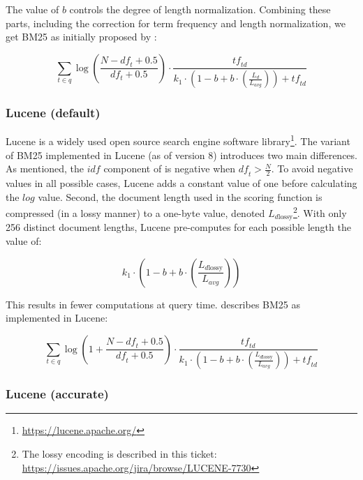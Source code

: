 The value of $b$ controls the degree of length normalization. Combining these parts, including the correction for term frequency and length normalization, we get BM25 as initially proposed by \citet{bm25-robertson}:

\begin{equation}
	\label{bm25-robertson}
	\sum_{t\in q} \log\left(\frac{N-\mathit{df}_t+0.5}{df_t+0.5}\right)\cdot\frac{\mathit{tf}_{\mathit{td}}}{k_1\cdot\left(1-b+b\cdot\left(\frac{L_d}{L_{\mathit{avg}}}\right)\right) + \mathit{tf}_{\mathit{td}}}
\end{equation}

\subsubsection{Lucene (default)}
Lucene is a widely used open source search engine software library\footnote{\url{https://lucene.apache.org/}}. 
The variant of BM25 implemented in Lucene (as of version 8) introduces two main differences. As mentioned, the $\mathit{idf}$ component of \citet{bm25-robertson} is negative when $\mathit{df}_t > \frac{N}{2}$.
To avoid negative values in all possible cases, Lucene adds a constant value of one before calculating the $log$ value. 
Second, the document length used in the scoring function is compressed (in a lossy manner) to a one-byte value, denoted $L_{d\text{lossy}}$\footnote{The lossy encoding is described in this ticket: \url{https://issues.apache.org/jira/browse/LUCENE-7730}}. With only 256 distinct document lengths, Lucene pre-computes for each possible length the value of:

\begin{equation}
	k_1 \cdot \left(1-b+b\cdot\left(\frac{L_{d\text{lossy}}}{L_{\mathit{avg}}}\right)\right)
\end{equation}

This results in fewer computations at query time.  describes BM25 as implemented in Lucene:

\begin{equation}
	\label{lucene-default}
	\sum_{t\in q}\log\left(1 + \frac{N-\mathit{df}_t+0.5}{\mathit{df}_t+0.5}\right)\cdot\frac{\mathit{tf}_{\mathit{td}}}{k_1\cdot\left(1-b+b\cdot\left(\frac{L_{d \text{lossy}}}{L_{\mathit{avg}}}\right)\right)+\mathit{tf}_{\mathit{td}}}
\end{equation}

\subsubsection{Lucene (accurate)}

